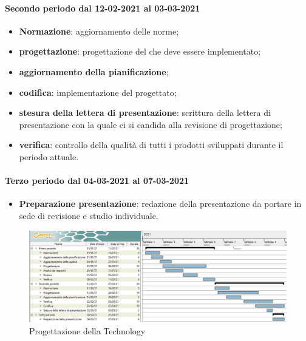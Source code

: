 	\paragraph{Secondo periodo dal 12-02-2021 al 03-03-2021}
	\begin{itemize}
	\item \textbf{Normazione}: aggiornamento delle norme;
	\item \textbf{progettazione}: progettazione del  che deve essere implementato;
	\item \textbf{aggiornamento della pianificazione};
	\item \textbf{codifica}: implementazione del  progettato;
	\item \textbf{stesura della lettera di presentazione}: scrittura della lettera di presentazione con la quale ci
	si candida alla revisione di progettazione;
	\item \textbf{verifica}: controllo della qualità di tutti i prodotti sviluppati durante il periodo attuale.
	\end{itemize}	
	
	\paragraph{Terzo periodo dal 04-03-2021 al 07-03-2021}
	\begin{itemize}
	\item \textbf{Preparazione presentazione}: redazione della presentazione da portare in sede di revisione e
	studio individuale.
	\end{itemize}

	\newpage
	
	\begin{landscape}
		\begin{figure}[h!]
			\includegraphics[width=24cm]{images/3_Progettazione_della_Technology.png}
			\caption{Progettazione della Technology}
		\end{figure}
	\end{landscape}
	

